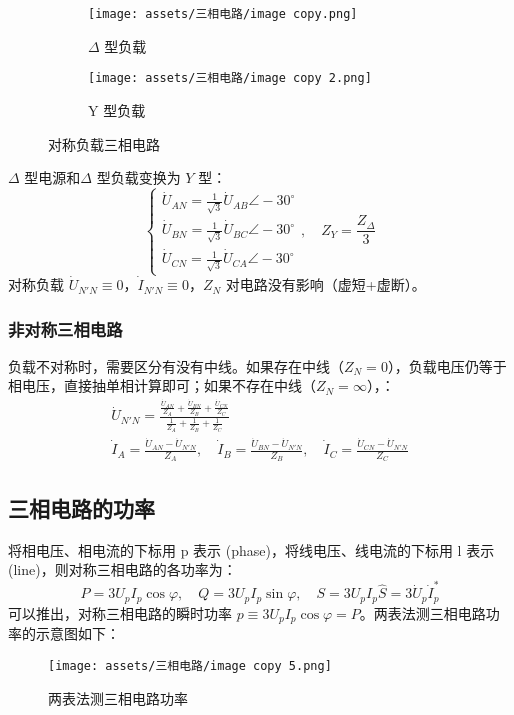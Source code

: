 \documentclass[a4paper]{article}  %
\theoremstyle{MyLineTheoremStyle} %
\theoremstyle{MyBlockTheoremStyle} %
\theoremstyle{MySubsubsectionStyle} %
\begin{document}
\begin{multicols*}{4}
\begin{figure}[H]\centering
\begin{subfigure}[b]{0.5\columnwidth}\centering
    \texttt{[image: assets/三相电路/image copy.png]}
    \caption{$\Delta$ 型负载}
\end{subfigure}\hfill
\begin{subfigure}[b]{0.5\columnwidth}\centering
    \texttt{[image: assets/三相电路/image copy 2.png]}
    \caption{Y 型负载}
\end{subfigure}
\caption{对称负载三相电路}
\end{figure}

$\Delta$ 型电源和$\Delta$ 型负载变换为 $Y$ 型：
\begin{equation}
\begin{cases}
\dot{U}_{AN} = \frac{1}{\sqrt{3}} \dot{U}_{AB} \angle -30^\circ \\
\dot{U}_{BN} = \frac{1}{\sqrt{3}} \dot{U}_{BC} \angle -30^\circ \\
\dot{U}_{CN} = \frac{1}{\sqrt{3}} \dot{U}_{CA} \angle -30^\circ
\end{cases},\quad 
Z_{Y} = \frac{Z_{\Delta}}{3}
\end{equation}
对称负载 $\dot{U}_{N'N} \equiv 0$，$\dot{I}_{N'N} \equiv 0$，$Z_N$ 对电路没有影响（虚短+虚断）。

\subsubsection{非对称三相电路}

负载不对称时，需要区分有没有中线。如果存在中线（$Z_N = 0$），负载电压仍等于相电压，直接抽单相计算即可；如果不存在中线（$Z_N = \infty$），：
\begin{gather}
\dot{U}_{N'N} = \frac{ \frac{\dot{U}_{AN}}{Z_A} + \frac{\dot{U}_{BN}}{Z_B} + \frac{\dot{U}_{CN}}{Z_C}  }{ \frac{1}{Z_A} + \frac{1}{Z_B} + \frac{1}{Z_C} } \\
\dot{I}_{A} = \frac{\dot{U}_{AN} - \dot{U}_{N'N} }{Z_A}, \quad 
\dot{I}_{B} = \frac{\dot{U}_{BN} - \dot{U}_{N'N} }{Z_B}, \quad
\dot{I}_{C} = \frac{\dot{U}_{CN} - \dot{U}_{N'N} }{Z_C}
\end{gather}

\subsection{三相电路的功率}

将相电压、相电流的下标用 p 表示 (phase)，将线电压、线电流的下标用 l 表示 (line)，则对称三相电路的各功率为：
\begin{equation}
P = 3 U_p I_p \cos \varphi,\quad 
Q = 3 U_p I_p \sin \varphi,\quad
S = 3 U_p I_p
\hat{S} = 3 \dot{U}_p \dot{I}_p^*
\end{equation}
可以推出，对称三相电路的瞬时功率 $p \equiv 3 U_p I_p \cos \varphi = P$。两表法测三相电路功率的示意图如下：
\begin{figure}[H]\centering
    \texttt{[image: assets/三相电路/image copy 5.png]}
    \caption{两表法测三相电路功率}
\end{figure}


\end{multicols*}
\end{document}
